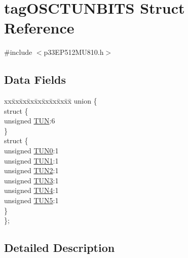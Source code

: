 \hypertarget{structtag_o_s_c_t_u_n_b_i_t_s}{}\section{tag\+O\+S\+C\+T\+U\+N\+B\+I\+TS Struct Reference}
\label{structtag_o_s_c_t_u_n_b_i_t_s}


{\ttfamily \#include $<$p33\+E\+P512\+M\+U810.\+h$>$}

\subsection*{Data Fields}
\begin{DoxyCompactItemize}
\item 
\begin{tabbing}
xx\=xx\=xx\=xx\=xx\=xx\=xx\=xx\=xx\=\kill
union \{\\
\>struct \{\\
\>\>unsigned \hyperlink{structtag_o_s_c_t_u_n_b_i_t_s_a11fb3128ca98255697c41d6e1e544a7f}{TUN}:6\\
\>\} \\
\>struct \{\\
\>\>unsigned \hyperlink{structtag_o_s_c_t_u_n_b_i_t_s_a33be6faef5c18356934f47fb28cfbed4}{TUN0}:1\\
\>\>unsigned \hyperlink{structtag_o_s_c_t_u_n_b_i_t_s_aa4ccc91073c67d3d9e7d671acf89dea4}{TUN1}:1\\
\>\>unsigned \hyperlink{structtag_o_s_c_t_u_n_b_i_t_s_a64dc8d1163082fd31503c0d5c30c1258}{TUN2}:1\\
\>\>unsigned \hyperlink{structtag_o_s_c_t_u_n_b_i_t_s_acdf35316973ec0ba36c0e450dd796551}{TUN3}:1\\
\>\>unsigned \hyperlink{structtag_o_s_c_t_u_n_b_i_t_s_aa6160c4f9517755d65ff45e469ab37c4}{TUN4}:1\\
\>\>unsigned \hyperlink{structtag_o_s_c_t_u_n_b_i_t_s_a310915f2163219d079f409e480fbb368}{TUN5}:1\\
\>\} \\
\}; \\

\end{tabbing}\end{DoxyCompactItemize}


\subsection{Detailed Description}


